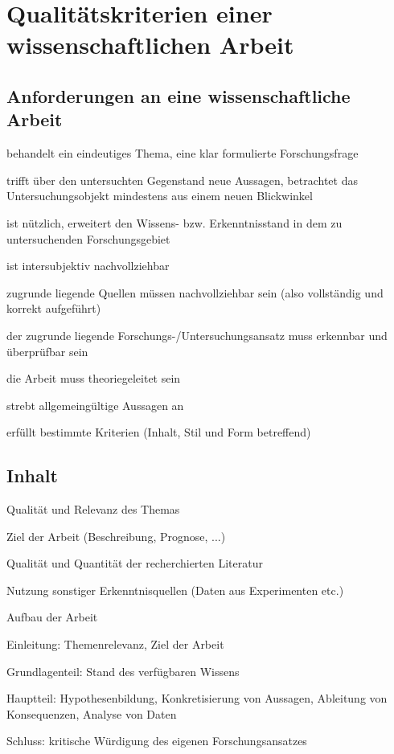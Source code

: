 \documentclass[a4paper,oneside,DIV8,10pt]{scrartcl}
\begin{document}
        
\section{Qualitätskriterien einer wissenschaftlichen Arbeit}

    \subsection{Anforderungen an eine wissenschaftliche Arbeit}
    \begin{compactitem}
        \item behandelt ein eindeutiges Thema, eine klar formulierte 
        Forschungsfrage
        \item trifft über den untersuchten Gegenstand neue Aussagen, 
        betrachtet das Untersuchungsobjekt mindestens aus einem neuen 
        Blickwinkel
        \item ist nützlich, erweitert den Wissens- bzw. Erkenntnisstand 
        in dem zu untersuchenden Forschungsgebiet
        \item ist intersubjektiv nachvollziehbar
        \item zugrunde liegende Quellen müssen nachvollziehbar sein (also 
        vollständig und korrekt aufgeführt)
        \item der zugrunde liegende Forschungs-/Untersuchungsansatz muss
        erkennbar und überprüfbar sein
        \item die Arbeit muss theoriegeleitet sein
        \item strebt allgemeingültige Aussagen an
        \item erfüllt bestimmte Kriterien (Inhalt, Stil und Form betreffend)
    \end{compactitem}
  
    \subsection{Inhalt}
    \begin{compactitem}
        \item Qualität und Relevanz des Themas
        \item Ziel der Arbeit (Beschreibung, Prognose, ...)
        \item Qualität und Quantität der recherchierten Literatur
        \item Nutzung sonstiger Erkenntnisquellen (Daten aus Experimenten etc.)
        \item Aufbau der Arbeit
        \begin{compactitem}
            \item Einleitung: Themenrelevanz, Ziel der Arbeit
            \item Grundlagenteil: Stand des verfügbaren Wissens
            \item Hauptteil: Hypothesenbildung, Konkretisierung von Aussagen, 
            Ableitung von Konsequenzen, Analyse von Daten
            \item Schluss: kritische Würdigung des eigenen Forschungsansatzes
        \end{compactitem}
    \end{compactitem}
\end{document}
